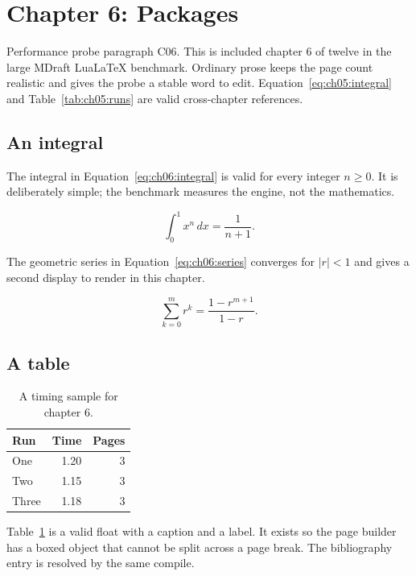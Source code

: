 \section{Chapter 6: Packages}
\label{sec:ch06}

Performance probe paragraph C06. This is included chapter 6 of twelve in
the large MDraft LuaLaTeX benchmark. Ordinary prose keeps the page count
realistic and gives the probe a stable word to edit. Equation~\ref{eq:ch05:integral} and
Table~\ref{tab:ch05:runs} are valid cross-chapter references.

\subsection{An integral}
The integral in Equation~\ref{eq:ch06:integral} is valid for every integer
$n \ge 0$. It is deliberately simple; the benchmark measures the engine, not
the mathematics.

\begin{equation}
  \label{eq:ch06:integral}
  \int_{0}^{1} x^{n}\,dx = \frac{1}{n+1}.
\end{equation}

The geometric series in Equation~\ref{eq:ch06:series} converges for
$|r| < 1$ and gives a second display to render in this chapter.

\begin{equation}
  \label{eq:ch06:series}
  \sum_{k=0}^{m} r^{k} = \frac{1-r^{m+1}}{1-r}.
\end{equation}

\subsection{A table}
\begin{table}[h]
  \centering
  \begin{tabular}{lrr}
    \toprule
    Run & Time & Pages \\
    \midrule
    One   & 1.20 & 3 \\
    Two   & 1.15 & 3 \\
    Three & 1.18 & 3 \\
    \bottomrule
  \end{tabular}
  \caption{A timing sample for chapter 6.}
  \label{tab:ch06:runs}
\end{table}

Table~\ref{tab:ch06:runs} is a valid float with a caption and a label. It
exists so the page builder has a boxed object that cannot be split across a
page break. The bibliography entry \cite{lamport1994} is resolved by the same compile.

